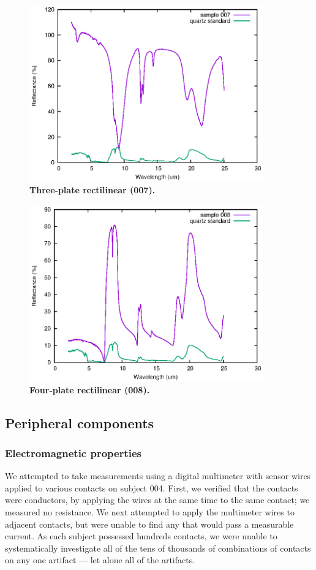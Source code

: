 \documentclass[10pt]{article}
\theoremstyle{definition}
\begin{document}
\begin{figure}
\includegraphics[angle=0,width=0.9\textwidth]{007.eps}
  \caption{\label{fig:007}\textbf{Three-plate rectilinear (007).}}
\end{figure}
\begin{figure}

\end{figure}
\begin{figure}
  \includegraphics[angle=0,width=0.9\textwidth]{008.eps}
    \caption{\label{fig:008}\textbf{Four-plate rectilinear (008).}}
\end{figure}

\subsection{Peripheral components}
\subsubsection{Electromagnetic properties}
We attempted to take measurements using a digital multimeter with sensor wires applied to various contacts on subject 004.
First, we verified that the contacts were conductors, by applying the wires at the same time to the same contact; we measured no resistance.
We next attempted to apply the multimeter wires to adjacent contacts, but were unable to find any that would pass a measurable current.
As each subject possessed hundreds contacts, we were unable to systematically investigate all of the tens of thousands of combinations of contacts on any one artifact --- let alone all of the artifacts.
\end{document}
